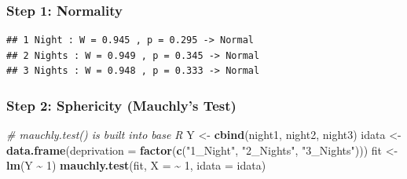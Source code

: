 \documentclass[
]{article}
\newenvironment{Shaded}{\begin{snugshade}}{\end{snugshade}}
\newcommand{\AttributeTok}[1]{\textcolor[rgb]{0.13,0.29,0.53}{#1}}
\newcommand{\CommentTok}[1]{\textcolor[rgb]{0.56,0.35,0.01}{\textit{#1}}}
\newcommand{\ControlFlowTok}[1]{\textcolor[rgb]{0.13,0.29,0.53}{\textbf{#1}}}
\newcommand{\DecValTok}[1]{\textcolor[rgb]{0.00,0.00,0.81}{#1}}
\newcommand{\FloatTok}[1]{\textcolor[rgb]{0.00,0.00,0.81}{#1}}
\newcommand{\FunctionTok}[1]{\textcolor[rgb]{0.13,0.29,0.53}{\textbf{#1}}}
\newcommand{\NormalTok}[1]{#1}
\newcommand{\OtherTok}[1]{\textcolor[rgb]{0.56,0.35,0.01}{#1}}
\newcommand{\SpecialCharTok}[1]{\textcolor[rgb]{0.81,0.36,0.00}{\textbf{#1}}}
\newcommand{\StringTok}[1]{\textcolor[rgb]{0.31,0.60,0.02}{#1}}
\begin{document}
\subsubsection{Step 1: Normality}\label{step-1-normality}

\begin{Shaded}
\end{Shaded}

\begin{verbatim}
## 1 Night : W = 0.945 , p = 0.295 -> Normal 
## 2 Nights : W = 0.949 , p = 0.345 -> Normal 
## 3 Nights : W = 0.948 , p = 0.333 -> Normal
\end{verbatim}

\subsubsection{Step 2: Sphericity (Mauchly's
Test)}\label{step-2-sphericity-mauchlys-test}

\begin{Shaded}
\begin{Highlighting}[]
\CommentTok{\# mauchly.test() is built into base R}
\NormalTok{Y     }\OtherTok{\textless{}{-}} \FunctionTok{cbind}\NormalTok{(night1, night2, night3)}
\NormalTok{idata }\OtherTok{\textless{}{-}} \FunctionTok{data.frame}\NormalTok{(}\AttributeTok{deprivation =} \FunctionTok{factor}\NormalTok{(}\FunctionTok{c}\NormalTok{(}\StringTok{"1\_Night"}\NormalTok{, }\StringTok{"2\_Nights"}\NormalTok{, }\StringTok{"3\_Nights"}\NormalTok{)))}
\NormalTok{fit   }\OtherTok{\textless{}{-}} \FunctionTok{lm}\NormalTok{(Y }\SpecialCharTok{\textasciitilde{}} \DecValTok{1}\NormalTok{)}
\FunctionTok{mauchly.test}\NormalTok{(fit, }\AttributeTok{X =} \SpecialCharTok{\textasciitilde{}} \DecValTok{1}\NormalTok{, }\AttributeTok{idata =}\NormalTok{ idata)}
\end{Highlighting}
\end{Shaded}
\end{document}
